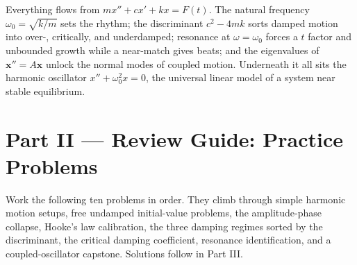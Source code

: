 \begin{conceptbox}
Everything flows from $m x'' + c x' + k x = F(t)$. The
\textcolor{accentorange}{natural frequency $\omega_0=\sqrt{k/m}$} sets the rhythm;
the \textcolor{accentorange}{discriminant $c^2-4mk$} sorts damped motion into
over-, critically, and underdamped; \textcolor{accentorange}{resonance at
$\omega=\omega_0$} forces a $t$ factor and unbounded growth while a near-match gives
\textcolor{accentorange}{beats}; and the \textcolor{accentorange}{eigenvalues of
$\mathbf{x}''=A\mathbf{x}$} unlock the normal modes of coupled motion. Underneath it
all sits the \textcolor{accentorange}{harmonic oscillator $x''+\omega_0^2 x=0$}, the
universal linear model of a system near stable equilibrium.
\end{conceptbox}

\clearpage
{}
{}
\section*{Part II --- Review Guide: Practice Problems}

Work the following ten problems in order. They climb through simple harmonic motion
setups, free undamped initial-value problems, the amplitude-phase collapse, Hooke's
law calibration, the three damping regimes sorted by the discriminant, the critical
damping coefficient, resonance identification, and a coupled-oscillator capstone.
Solutions follow in Part III.

